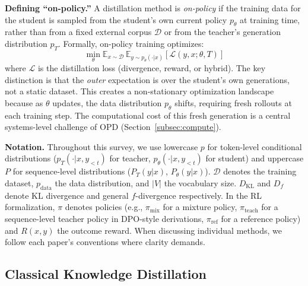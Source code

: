 \documentclass{article} %
\newcommand{\E}{\mathbb{E}}
\newcommand{\KL}{D_{\mathrm{KL}}}
\newcommand{\ptheta}{p_\theta}
\newcommand{\pteacher}{p_T}
\newcommand{\pdata}{p_{\mathrm{data}}}
\begin{document}
\textbf{Defining ``on-policy.''} A distillation method is \emph{on-policy} if the training data for the student is sampled from the student's own current policy $\ptheta$ at training time, rather than from a fixed external corpus $\mathcal{D}$ or from the teacher's generation distribution $\pteacher$. Formally, on-policy training optimizes:
\begin{equation*}
    \min_\theta \E_{x \sim \mathcal{D}}\, \E_{y \sim \ptheta(\cdot|x)} \left[ \mathcal{L}(y, x; \theta, T) \right]
\end{equation*}
where $\mathcal{L}$ is the distillation loss (divergence, reward, or hybrid). The key distinction is that the \emph{outer} expectation is over the student's own generations, not a static dataset. This creates a non-stationary optimization landscape because as $\theta$ updates, the data distribution $\ptheta$ shifts, requiring fresh rollouts at each training step. The computational cost of this fresh generation is a central systems-level challenge of OPD (Section~\ref{subsec:compute}).

\textbf{Notation.} Throughout this survey, we use lowercase $p$ for token-level conditional distributions ($\pteacher(\cdot|x, y_{<t})$ for teacher, $\ptheta(\cdot|x, y_{<t})$ for student) and uppercase $P$ for sequence-level distributions ($P_T(y|x)$, $P_\theta(y|x)$). $\mathcal{D}$ denotes the training dataset, $\pdata$ the data distribution, and $|V|$ the vocabulary size. $\KL$ and $D_f$ denote KL divergence and general $f$-divergence respectively. In the RL formalization, $\pi$ denotes policies (e.g., $\pi_{\mathrm{mix}}$ for a mixture policy, $\pi_{\text{teach}}$ for a sequence-level teacher policy in DPO-style derivations, $\pi_{\text{ref}}$ for a reference policy) and $R(x,y)$ the outcome reward. When discussing individual methods, we follow each paper's conventions where clarity demands.

\subsection{Classical Knowledge Distillation}
\end{document}
